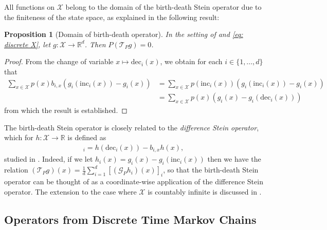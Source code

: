 \documentclass[12pt,paper=letter]{scrreprt}
\newtheorem{proposition}{Proposition}[chapter]
\def\reals{\mathbb{R}} %
\newcommand{\xset}[0]{\mathcal{X}} %
\newcommand{\gset}[0]{\mathcal{G}} %
\newcommand{\TP}{\mathcal{T}_P}
\begin{document}
All functions on $\xset$ belong to the domain of the birth-death Stein operator due to the finiteness of the state space, as explained in the following result:

\begin{proposition}[Domain of birth-death operator]
    In the setting of  and \cref{eq: discrete X}, let $g : \xset \rightarrow \reals^d$.
    Then $P(\TP g) = 0$.
\end{proposition}
\begin{proof}
From the change of variable $x \mapsto \mathrm{dec}_i(x)$, we obtain for each $i \in \{1 , \dots , d\}$ that
\begin{align*}
    \sum_{x \in \xset} p(x) b_{i,x} (g_i(\mathrm{inc}_i(x)) - g_i(x)) & = \sum_{x \in \xset} p(\mathrm{inc}_i(x)) (g_i(\mathrm{inc}_i(x)) - g_i(x)) \\
    & = \sum_{x \in \xset} p(x) (g_i(x) - g_i(\mathrm{dec}_i(x)))
\end{align*}    
from which the result is established.
\end{proof}

The birth-death Stein operator is closely related to the \emph{difference Stein operator}, which for $h : \mathcal{X} \rightarrow \mathbb{R}$ is defined as
\begin{align*}
    [(\gset_P h)(x)]_i = h(\mathrm{dec}_i(x)) - b_{i,x}  h(x) ,
\end{align*}
studied in \citet{yang2018goodness}.
Indeed, if we let $h_i(x) = g_i(x) - g_i(\mathrm{inc}_i(x))$ then we have the relation $(\mathcal{T}_P g)(x) = \frac{1}{d} \sum_{i=1}^d [(\gset_P h_i)(x)]_i$, so that the birth-death Stein operator can be thought of as a coordinate-wise application of the difference Stein operator.
The extension to the case where $\xset$ is countably infinite is discussed in \citet{hodgkinson2020reproducing,matsubara2023generalized}.




\subsection{Operators from Discrete Time Markov Chains}
\label{subsec: operators from Markov}
\end{document}
